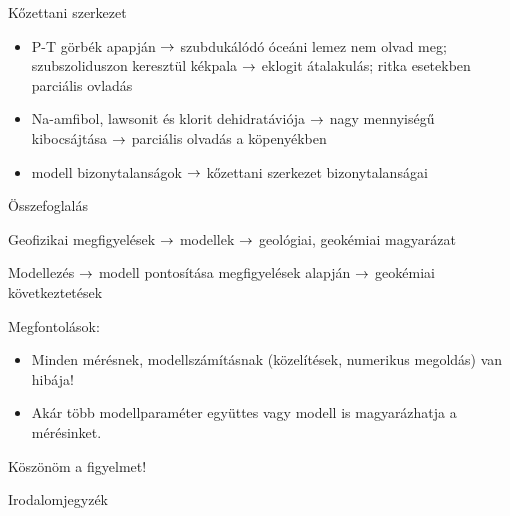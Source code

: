 \documentclass{beamer}
\begin{document}
\begin{frame}{Kőzettani szerkezet}
    \begin{minipage}[c]{0.45\textwidth}
        \centering
    \end{minipage}
    \hspace{5pt}
    \begin{minipage}[c]{0.45\textwidth}
        \begin{itemize}
            \item P-T görbék apapján $\rightarrow$ szubdukálódó óceáni lemez nem olvad meg; szubszoliduszon keresztül kékpala $\rightarrow$ eklogit átalakulás; ritka esetekben parciális ovladás
            \item Na-amfibol, lawsonit és klorit dehidratáviója $\rightarrow$ nagy mennyiségű  kibocsájtása $\rightarrow$ parciális olvadás a köpenyékben
            \item modell bizonytalanságok $\rightarrow$ kőzettani szerkezet bizonytalanságai
        \end{itemize}
    \end{minipage}
\end{frame}


\begin{frame}{Összefoglalás}

    {\Large
    Geofizikai megfigyelések $\rightarrow$ modellek $\rightarrow$ geológiai, geokémiai magyarázat
    \vspace{20pt}
    
    Modellezés $\rightarrow$ modell pontosítása megfigyelések alapján $\rightarrow$ geokémiai következtetések
    }
    \vspace{20pt}
    
    Megfontolások:
    \begin{itemize}
        \item Minden mérésnek, modellszámításnak (közelítések, numerikus megoldás) van hibája!
        \item Akár több modellparaméter együttes vagy modell is magyarázhatja a mérésinket.
    \end{itemize}
\end{frame}


\begin{frame}
    \begin{center}
        \Huge \color{blue!55!black}
        Köszönöm a figyelmet!
    \end{center}
\end{frame}


\begin{frame}{Irodalomjegyzék}
    {\tiny
    
    }
\end{frame}
\end{document}
